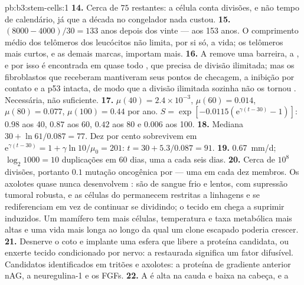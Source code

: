 \begin{solution}{pb:b3:stem-cells:1}
\textbf{14.} Cerca de $75$ restantes: a célula conta divisões, e não
tempo de calendário, já que a década no congelador nada custou.
\textbf{15.} $(8000 - 4000)/30 = 133$ anos depois dos vinte --- aos 153
anos. O comprimento médio dos telômeros dos leucócitos não limita, por si
só, a vida; os telômeros mais curtos, e as demais marcas, importam mais.
\textbf{16.} A  remove uma barreira, a ,
e por isso é encontrada em quase todo , que precisa de divisão
ilimitada; mas os fibroblastos que receberam  mantiveram seus
pontos de checagem, a inibição por contato e a p53 intacta, de modo que a
divisão ilimitada sozinha não os tornou . Necessária, não
suficiente.
\textbf{17.} $\mu(40) = 2.4\times 10^{-3}$, $\mu(60) = 0.014$, $\mu(80) =
0.077$, $\mu(100) = 0.44$ por ano. $S = \exp[-0.0115(\mathrm{e}^{\gamma
(t-30)} - 1)]$: $0.98$ aos 40, $0.87$ aos 60, $0.42$ aos 80 e $0.006$ aos
100.
\textbf{18.} Mediana $30 + \ln 61/0.087 = 77$. Dez por cento sobrevivem
em $\mathrm{e}^{\gamma(t-30)} = 1 + \gamma\ln 10/\mu_{0} = 201$: $t = 30 +
5.3/0.087 = 91$.
\textbf{19.} \qty{0.67}{mm/d}; $\log_{2}1000 = 10$ duplicações em 60
dias, uma a cada seis dias.
\textbf{20.} Cerca de $10^{8}$ divisões, portanto $0.1$ mutação
oncogênica por  --- uma em cada dez membros. Os axolotes quase
nunca desenvolvem : são de sangue frio e lentos, com supressão
tumoral robusta, e as células do  permanecem restritas a
linhagens e se rediferenciam em vez de continuar se dividindo; o tecido
em  chega a suprimir  induzidos. Um mamífero tem mais
células, temperatura e taxa metabólica mais altas e uma vida mais longa
ao longo da qual um clone escapado poderia crescer.
\textbf{21.} Desnerve o coto e implante uma esfera que libere a proteína
candidata, ou enxerte tecido condicionado por nervo: a 
restaurada significa um fator difusível. Candidatos identificados em
tritões e axolotes: a proteína de gradiente anterior nAG, a
neuregulina-1 e os FGFs.
\textbf{22.} A  é alta na cauda e baixa na cabeça, e a

\end{solution}
